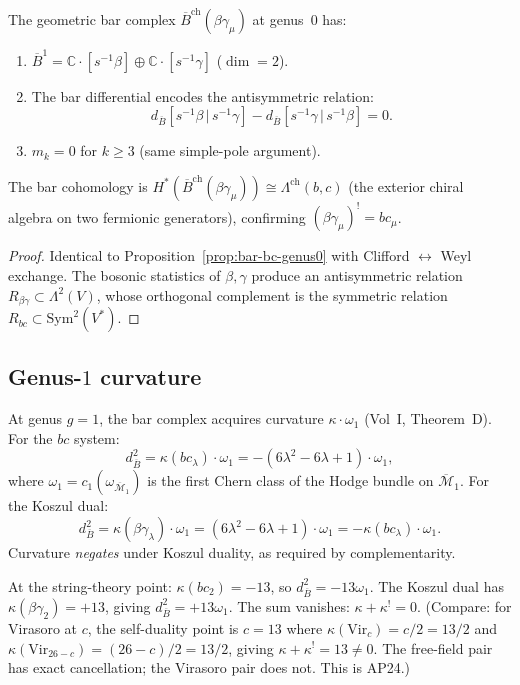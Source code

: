 \documentclass[11pt]{article}
\newcommand{\cM}{\mathcal{M}}
\newcommand{\barB}{\overline{B}}
\newcommand{\C}{\mathbb{C}}
\begin{document}
\begin{proposition}
\label{prop:bar-bg-genus0}
The geometric bar complex $\barB^{\mathrm{ch}}(\beta\gamma_\mu)$
at genus~$0$ has:
\begin{enumerate}
\item $\barB^1 = \C \cdot [s^{-1}\beta] \oplus \C \cdot
  [s^{-1}\gamma]$ ($\dim = 2$).
\item The bar differential encodes the antisymmetric relation:
  \[
  d_{\barB}[s^{-1}\beta \,|\, s^{-1}\gamma]
  - d_{\barB}[s^{-1}\gamma \,|\, s^{-1}\beta] = 0.
  \]
\item $m_k = 0$ for $k \ge 3$ (same simple-pole argument).
\end{enumerate}
The bar cohomology is
$H^*(\barB^{\mathrm{ch}}(\beta\gamma_\mu))
\cong \Lambda^{\mathrm{ch}}(b, c)$
(the exterior chiral algebra on two fermionic generators),
confirming $(\beta\gamma_\mu)^! = bc_\mu$.
\end{proposition}

\begin{proof}
Identical to Proposition~\ref{prop:bar-bc-genus0} with
Clifford $\leftrightarrow$ Weyl exchange.  The bosonic
statistics of $\beta, \gamma$ produce an antisymmetric
relation $R_{\beta\gamma} \subset \Lambda^2(V)$, whose
orthogonal complement is the symmetric relation
$R_{bc} \subset \mathrm{Sym}^2(V^*)$.
\end{proof}


\subsection{Genus-$1$ curvature}

At genus $g = 1$, the bar complex acquires curvature
$\kappa \cdot \omega_1$ (Vol~I, Theorem~D).  For the $bc$
system:
\begin{equation}\label{eq:bc-curvature-g1}
d_{\barB}^2 = \kappa(bc_\lambda) \cdot \omega_1
= -(6\lambda^2 - 6\lambda + 1) \cdot \omega_1,
\end{equation}
where $\omega_1 = c_1(\omega_{\overline{\cM}_1})$ is the first
Chern class of the Hodge bundle on $\overline{\cM}_1$.  For
the Koszul dual:
\[
d_{\barB}^2 = \kappa(\beta\gamma_\lambda) \cdot \omega_1
= (6\lambda^2 - 6\lambda + 1) \cdot \omega_1
= -\kappa(bc_\lambda) \cdot \omega_1.
\]
Curvature \emph{negates} under Koszul duality, as required by
complementarity.

At the string-theory point: $\kappa(bc_2) = -13$, so
$d_{\barB}^2 = -13\omega_1$.  The Koszul dual has
$\kappa(\beta\gamma_2) = +13$, giving $d_{\barB}^2
= +13\omega_1$.  The sum vanishes:
$\kappa + \kappa^! = 0$.  (Compare: for Virasoro at $c$,
the self-duality point is $c = 13$ where
$\kappa(\mathrm{Vir}_c) = c/2 = 13/2$ and
$\kappa(\mathrm{Vir}_{26-c}) = (26{-}c)/2 = 13/2$,
giving $\kappa + \kappa^! = 13 \neq 0$.
The free-field pair has exact cancellation; the
Virasoro pair does not.  This is AP24.)
\end{document}
